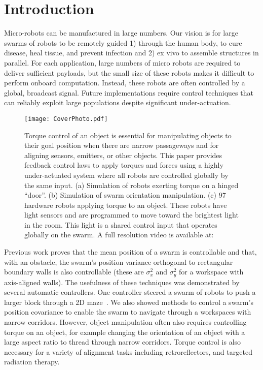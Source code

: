 \section{Introduction}\label{sec:Intro}
Micro-robots can be manufactured in large numbers.
Our vision is for large swarms of robots to be remotely guided 1) through the human body, to cure disease, heal tissue, and prevent infection and 2) ex vivo to assemble structures in parallel. 
 For each application, large numbers of micro robots are required  to deliver sufficient payloads, but the small size of these robots makes it difficult to perform onboard computation.  Instead, these robots are often controlled by a global, broadcast signal. 
 Future implementations require control techniques that can reliably exploit large populations despite significant under-actuation.  
 

\begin{figure}
\begin{center}
	\texttt{[image: CoverPhoto.pdf]}
\end{center}
\vspace{-1em}
\caption{\label{fig:FirstImage}
Torque control of an object is essential for manipulating objects to their goal position  when there are narrow passageways and for aligning sensors, emitters, or other objects. 
This paper provides feedback control laws to apply torques and forces using a highly under-actuated system where all 
robots are controlled globally by the same input. 
(a) Simulation of robots exerting torque on a hinged ``door''.
(b) Simulation of swarm orientation manipulation.
(c) 97 hardware robots applying torque to an object. These robots have light sensors and are programmed to move toward the brightest light in the room.  This light is a shared control input that operates globally on the swarm. A full resolution video is available at:~\cite{ShahrokhiTorqueVideo}
}
\vspace{-1em}
\end{figure}


Previous work proves that the mean position of a swarm is controllable and that, with an obstacle, the swarm's position variance orthogonal to rectangular boundary walls  is also controllable
(these are $\sigma_x^2$ and $\sigma_y^2$ for a workspace with axis-aligned walls). 
The usefulness of these techniques was demonstrated by several automatic controllers. One controller steered a swarm of robots to push a larger block through a 2D maze~\cite{ShahrokhiIROS2015}. 
We also showed methods to control a swarm's position covariance to enable the swarm to navigate through a workspaces with narrow corridors.  
However, object manipulation often also requires controlling torque on an object, for example changing the orientation of an object with a large aspect ratio to thread through narrow corridors.
Torque control  is also necessary for a variety of alignment tasks including retroreflectors, and targeted radiation therapy.

